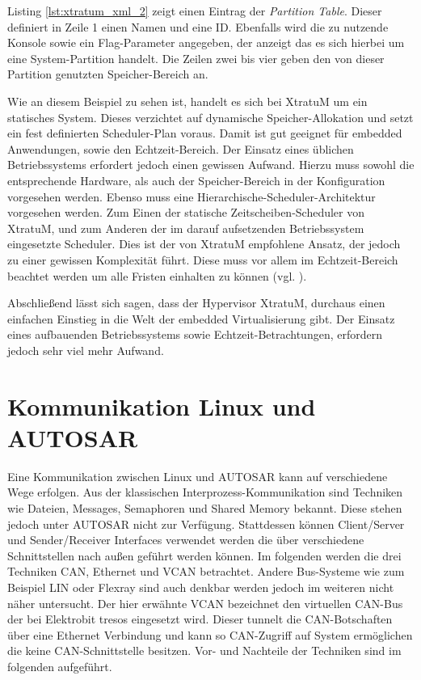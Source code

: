 \documentclass[
  a4paper,					    %
  twoside,
  DIV=calc,     				%
  bibliography=totoc,
  cleardoublepage=empty,
  ngerman,     					%
  final       					%
]{scrbook}
\begin{document}
Listing \ref{lst:xtratum_xml_2} zeigt einen Eintrag der \emph{Partition Table}. Dieser definiert in Zeile 1 einen Namen und eine ID. Ebenfalls wird die zu nutzende Konsole sowie ein Flag-Parameter angegeben, der anzeigt das es sich hierbei um eine System-Partition handelt. Die Zeilen zwei bis vier geben den von dieser Partition genutzten Speicher-Bereich an.

Wie an diesem Beispiel zu sehen ist, handelt es sich bei XtratuM um ein statisches System. Dieses verzichtet auf dynamische Speicher-Allokation und setzt ein fest definierten Scheduler-Plan voraus. Damit ist gut geeignet für embedded Anwendungen, sowie den Echtzeit-Bereich. Der Einsatz eines üblichen Betriebssystems erfordert jedoch einen gewissen Aufwand. Hierzu muss sowohl die entsprechende Hardware, als auch der Speicher-Bereich in der Konfiguration vorgesehen werden. Ebenso muss eine Hierarchische-Scheduler-Architektur vorgesehen werden. Zum Einen der statische Zeitscheiben-Scheduler von XtratuM, und zum Anderen der im darauf aufsetzenden Betriebssystem eingesetzte Scheduler. Dies ist der von XtratuM empfohlene Ansatz, der jedoch zu einer gewissen Komplexität führt. Diese muss vor allem im Echtzeit-Bereich beachtet werden um alle Fristen einhalten zu können (vgl. \cite{two_lvl_sched}).

Abschließend lässt sich sagen, dass der Hypervisor XtratuM, durchaus einen einfachen Einstieg in die Welt der embedded Virtualisierung gibt. Der Einsatz eines aufbauenden Betriebssystems sowie Echtzeit-Betrachtungen, erfordern jedoch sehr viel mehr Aufwand.




















\section{Kommunikation Linux und AUTOSAR}
\label{sec:Kommunikation_L_A}
Eine Kommunikation zwischen Linux und AUTOSAR kann auf verschiedene Wege erfolgen. Aus der klassischen Interprozess-Kommunikation sind Techniken wie Dateien, Messages, Semaphoren und Shared Memory bekannt. Diese stehen jedoch unter AUTOSAR nicht zur Verfügung. Stattdessen können Client/Server und Sender/Receiver Interfaces verwendet werden die über verschiedene Schnittstellen nach außen geführt werden können. Im folgenden werden die drei Techniken CAN, Ethernet und VCAN betrachtet. Andere Bus-Systeme wie zum Beispiel LIN oder Flexray sind auch denkbar werden jedoch im weiteren nicht näher untersucht. Der hier erwähnte VCAN bezeichnet den virtuellen CAN-Bus der bei Elektrobit tresos eingesetzt wird. Dieser tunnelt die CAN-Botschaften über eine Ethernet Verbindung und kann so CAN-Zugriff auf System ermöglichen die keine CAN-Schnittstelle besitzen. Vor- und Nachteile der Techniken sind im folgenden aufgeführt.
\end{document}
